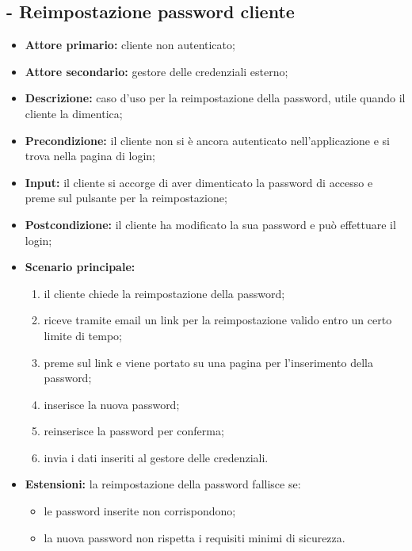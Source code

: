 \stepUserCase
\subsection{ - Reimpostazione password cliente}
\begin{itemize}
    \item \textbf{Attore primario:} cliente non autenticato;
    \item \textbf{Attore secondario:} gestore delle credenziali esterno;
    \item \textbf{Descrizione:} caso d'uso per la reimpostazione della password, utile quando il cliente la dimentica;
    \item \textbf{Precondizione:} il cliente non si è ancora autenticato nell'applicazione e si trova nella pagina di login;
    \item \textbf{Input:} il cliente si accorge di aver dimenticato la password di accesso e preme sul pulsante per la reimpostazione;
    \item \textbf{Postcondizione:} il cliente ha modificato la sua password e può effettuare il login;
    \item \textbf{Scenario principale:}
    \begin{enumerate}
        \item il cliente chiede la reimpostazione della password;
        \item riceve tramite email un link per la reimpostazione valido entro un certo limite di tempo;
        \item preme sul link e viene portato su una pagina per l'inserimento della password;
        \item inserisce la nuova password;
        \item reinserisce la password per conferma;
        \item invia i dati inseriti al gestore delle credenziali.
    \end{enumerate}
    \item \textbf{Estensioni:} la reimpostazione della password fallisce se:
    \begin{itemize}
        \item le password inserite non corrispondono;
        \item la nuova password non rispetta i requisiti minimi di sicurezza.
    \end{itemize}
\end{itemize}

\stepUserCase
